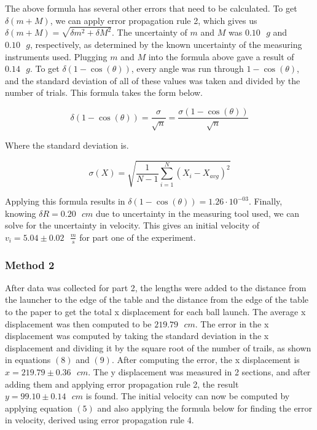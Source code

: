 \documentclass[11pt]{article}
\begin{document}
The above formula has several other errors that need to be calculated.
To get \(\delta(m + M)\), we can apply error propagation rule 2, which
gives us \(\delta(m + M) = \sqrt{\delta m^2 + \delta M^2}\). The
uncertainty of \(m\) and \(M\) was \(0.10 \text{ }g\) and
\(0.10 \text{ }g\), respectively, as determined by the known uncertainty
of the measuring instruments used. Plugging \(m\) and \(M\) into the
formula above gave a result of \(0.14 \text{ }g\). To get
\(\delta(1 - \cos(\theta))\), every angle was run through
\(1 - \cos(\theta)\), and the standard deviation of all of these values
was taken and divided by the number of trials. This formula takes the
form below.

\begin{equation}
\delta(1 - \cos(\theta)) = \frac {\sigma}{\sqrt{n}} = \frac {\sigma(1 - \cos(\theta))}{\sqrt{n}}
\end{equation}

 Where the standard deviation is.
 
 \begin{equation}
\sigma(X)=\sqrt{\frac{1}{N-1}\sum_{i=1}^N(X_i - X_{avg})^2}
\end{equation}

Applying this formula results in
\(\delta(1 - \cos(\theta)) = 1.26 \cdot 10^{-03}\). Finally, knowing
\(\delta R = 0.20 \text{ }cm\) due to uncertainty in the measuring tool
used, we can solve for the uncertainty in velocity. This gives an
initial velocity of \(v_i = 5.04 \pm 0.02\text{ }\frac {m}{s}\) for part
one of the experiment.

\hypertarget{method-2-2}{%
\subsubsection*{\centering Method 2}\label{method-2-2}}

After data was collected for part 2, the lengths were added to the
distance from the launcher to the edge of the table and the distance
from the edge of the table to the paper to get the total x displacement
for each ball launch. The average x displacement was then computed to be
\(219.79 \text{ }cm\). The error in the x displacement was computed by
taking the standard deviation in the x displacement and dividing it by
the square root of the number of trails, as shown in equations \((8)\)
and \((9)\). After computing the error, the x displacement is
\(x = 219.79 \pm 0.36\text{ }cm\). The y displacement was measured in 2
sections, and after adding them and applying error propagation rule 2,
the result \(y = 99.10 \pm 0.14\text{ }cm\) is found. The initial
velocity can now be computed by applying equation \((5)\) and also
applying the formula below for finding the error in velocity, derived
using error propagation rule 4.
\end{document}
